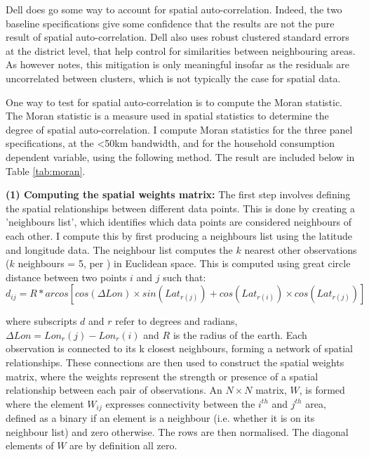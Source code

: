 \documentclass[12pt]{article}
\begin{document}
Dell does go some way to account for spatial auto-correlation. Indeed, the two baseline specifications give some confidence that the results are not the pure result of spatial auto-correlation. Dell also uses robust clustered standard errors at the district level, that help control for similarities between neighbouring areas. As \autocite{Kelly2019ThePersistence} however notes, this mitigation is only meaningful insofar as the residuals are uncorrelated between clusters, which is not typically the case for spatial data.

One way to test for spatial auto-correlation is to compute the Moran statistic. The Moran statistic \autocite{Moran1950NotesPhenomena} is a measure used in spatial statistics to determine the degree of spatial auto-correlation. I compute Moran statistics for the three panel specifications, at the \textless50km bandwidth, and for the household consumption dependent variable, using the following method. The result are included below in Table \ref{tab:moran}.

\textbf{(1) Computing the spatial weights matrix:} The first step involves defining the spatial relationships between different data points. This is done by creating a 'neighbours list', which identifies which data points are considered neighbours of each other. I compute this by first producing a neighbours list using the latitude and longitude data. The neighbour list computes the $k$ nearest other observations ($k$ neighbours = 5, per \autocite{Kelly2020UnderstandingPersistence}) in Euclidean space. This is computed using great circle distance between two points $i$ and $j$ such that:
\begin{equation} \label{eq:2}
 d_{ij} = R * arcos[cos(\Delta Lon)\times sin(Lat_{r(j)})+cos(Lat_{r(i)})\times cos(Lat_{r(j)})]
\end{equation}
   
where subscripts $d$ and $r$ refer to degrees and radians, $\Delta Lon = Lon_r(j) - Lon_r(i)$ and $R$ is the radius of the earth. Each observation is connected to its k closest neighbours, forming a network of spatial relationships. These connections are then used to construct the spatial weights matrix, where the weights represent the strength or presence of a spatial relationship between each pair of observations. An $N \times N$ matrix, $W$, is formed where the element $W_{ij}$ expresses connectivity between the $i^{th}$ and $j^{th}$ area, defined as a binary if an element is a neighbour (i.e. whether it is on its neighbour list) and zero otherwise. The rows are then normalised. The diagonal elements of $W$ are by definition all zero.  
   
\end{document}
